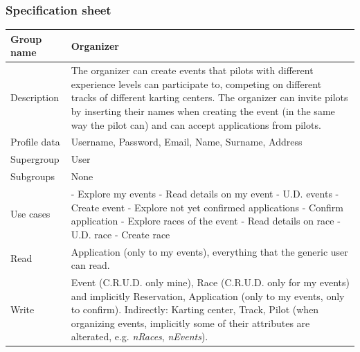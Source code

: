 \documentclass{beamer}
\begin{document}
\begin{frame}
    \frametitle{Specification sheet}
    \begin{table}
        \tiny
        \begin{tabular}{|p{2cm}|p{6cm}|}
        \hline
        Group name & \textbf{Organizer} \\
        \hline
        Description & The organizer can create events that pilots with different experience levels can participate to,
        competing on different tracks of different karting centers. The organizer can invite pilots by inserting their names
        when creating the event (in the same way the pilot can) and can accept applications from pilots. \\
        \hline
        Profile data & Username, Password, Email, Name, Surname, Address \\
        \hline
        Supergroup & User \\
        \hline
        Subgroups & None \\
        \hline
        Use cases &
        - Explore my events \newline
        - Read details on my event \newline
        - U.D. events \newline
        - Create event \newline
        - Explore not yet confirmed applications \newline
        - Confirm application \newline
        - Explore races of the event \newline
        - Read details on race \newline
        - U.D. race \newline
        - Create race \\
        \hline
        Read & Application (only to my events), everything that the generic user can read. \\
        \hline
        Write & Event (C.R.U.D. only mine), Race (C.R.U.D. only for my events) and implicitly Reservation, Application (only to my events, only to confirm). \newline
        Indirectly: Karting center, Track, Pilot (when organizing events, implicitly some of their 
        attributes are alterated, e.g. \textit{nRaces}, \textit{nEvents}). \\
        \hline
        \end{tabular}
    \end{table}
\end{frame}
\end{document}
